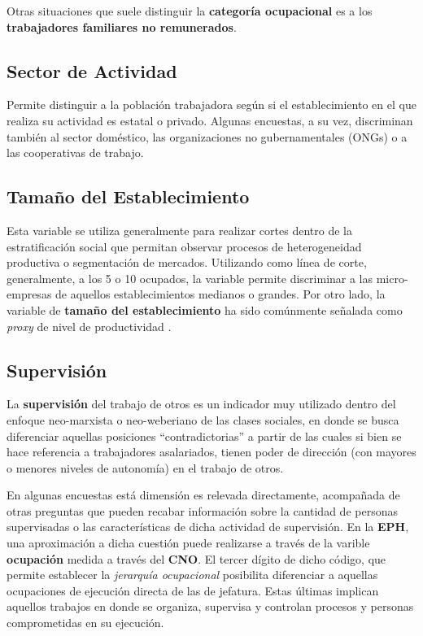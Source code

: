 \documentclass[
]{book}
\begin{document}
Otras situaciones que suele distinguir la \textbf{categoría ocupacional} es a los \textbf{trabajadores familiares no remunerados}.

\hypertarget{sector-de-actividad}{%
\subsection{Sector de Actividad}\label{sector-de-actividad}}

Permite distinguir a la población trabajadora según si el establecimiento en el que realiza su actividad es estatal o privado. Algunas encuestas, a su vez, discriminan también al sector doméstico, las organizaciones no gubernamentales (ONGs) o a las cooperativas de trabajo.

\hypertarget{tamauxf1o-del-establecimiento}{%
\subsection{Tamaño del Establecimiento}\label{tamauxf1o-del-establecimiento}}

Esta variable se utiliza generalmente para realizar cortes dentro de la estratificación social que permitan observar procesos de heterogeneidad productiva o segmentación de mercados. Utilizando como línea de corte, generalmente, a los 5 o 10 ocupados, la variable permite discriminar a las micro-empresas de aquellos establecimientos medianos o grandes. Por otro lado, la variable de \textbf{tamaño del establecimiento} ha sido comúnmente señalada como \emph{proxy} de nivel de productividad \citep{Tokman1987}.

\hypertarget{supervisiuxf3n}{%
\subsection{Supervisión}\label{supervisiuxf3n}}

La \textbf{supervisión} del trabajo de otros es un indicador muy utilizado dentro del enfoque neo-marxista o neo-weberiano de las clases sociales, en donde se busca diferenciar aquellas posiciones ``contradictorias'' a partir de las cuales si bien se hace referencia a trabajadores asalariados, tienen poder de dirección (con mayores o menores niveles de autonomía) en el trabajo de otros.

En algunas encuestas está dimensión es relevada directamente, acompañada de otras preguntas que pueden recabar información sobre la cantidad de personas supervisadas o las características de dicha actividad de supervisión. En la \textbf{EPH}, una aproximación a dicha cuestión puede realizarse a través de la varible \textbf{ocupación} medida a través del \textbf{CNO}. El tercer dígito de dicho código, que permite establecer la \emph{jerarquía ocupacional} posibilita diferenciar a aquellas ocupaciones de ejecución directa de las de jefatura. Estas últimas implican aquellos trabajos en donde se organiza, supervisa y controlan procesos y personas comprometidas en su ejecución.
\end{document}
